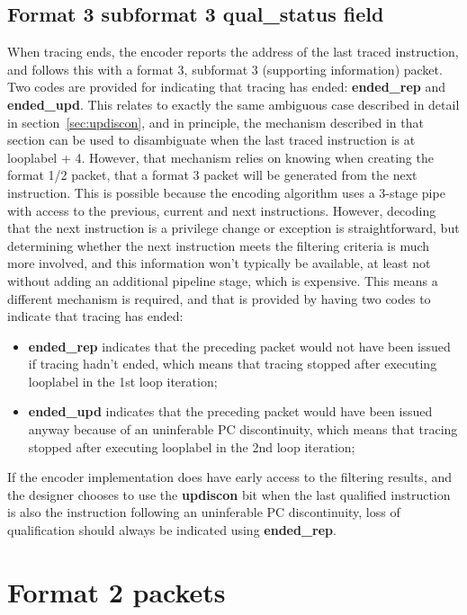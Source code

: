 \subsection{Format 3 subformat 3 \textbf{qual\_status} field}

When tracing ends, the encoder reports the address of the last traced instruction, and follows this with a format 3, 
subformat 3 (supporting information) packet.  Two codes are provided for indicating that tracing has ended: 
\textbf{ended\_rep} and \textbf{ended\_upd}.  This relates to exactly the same ambiguous case described in detail in 
section~\ref{sec:updiscon}, and in principle, the mechanism described in that section can be used to disambiguate when the last traced
instruction is at looplabel + 4.  However, that mechanism relies on knowing when creating the format 1/2 packet, that 
a format 3 packet will be generated from the next instruction.  This is possible because the encoding algorithm uses 
a 3-stage pipe with access to the previous, current and next instructions.  However, decoding that the next instruction
is a privilege change or exception is straightforward, but determining whether the next instruction meets the filtering
criteria is much more involved, and this information won't typically be available, at least not without adding an
additional pipeline stage, which is expensive.  This means a different mechanism is required, and that is provided
by having two codes to indicate that tracing has ended:

\begin{itemize}
  \item \textbf{ended\_rep} indicates that the preceding packet would not have been issued if tracing hadn't ended, 
    which means that tracing stopped after executing looplabel in the 1st loop iteration;
  \item \textbf{ended\_upd} indicates that the preceding packet would have been issued anyway because of an uninferable
    PC discontinuity, which means that tracing stopped after executing looplabel in the 2nd loop iteration;
\end{itemize}

If the encoder implementation does have early access to the filtering results, and the designer chooses to use the
\textbf{updiscon} bit when the last qualified instruction is also the instruction following an uninferable PC discontinuity,
loss of qualification should always be indicated using \textbf{ended\_rep}.

\FloatBarrier
\section{Format 2 packets} \label{sec:format2}


